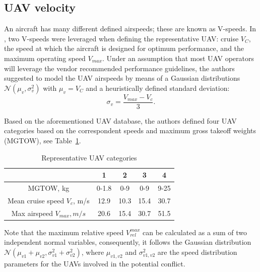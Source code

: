 \documentclass[conference]{IEEEtran}
\begin{document}
\subsection{UAV velocity}\label{sec:velocity}
An aircraft has many different defined airspeeds; these
are known as V-speeds. In \cite{Weinert18}, two V-speeds were leveraged when defining the representative UAV: cruise $V_C$, the speed at which the
aircraft is designed for optimum performance, and the maximum operating speed $V_{max}$. Under an assumption that most UAV operators will leverage the vendor recommended performance guidelines, the authors suggested to model the UAV airspeeds by means of a Gaussian distributions $\mathcal{N}(\mu_v,\sigma^2_v)$ with $\mu_v=V_C$ and a heuristically defined standard deviation:
\begin{equation}\label{eq:speed_sigma}
    \sigma_v = \frac{V_{max}-V_c}{3}.
\end{equation}

Based on the aforementioned UAV database, the authors defined four UAV categories based on the correspondent speeds and maximum gross takeoff weights (MGTOW), see Table~\ref{tab:velocity}. 
\begin{table}[]
    \centering
        \caption{Representative UAV categories}
    \begin{tabular}{c|c|c|c|c}
        &1&2&3&4  \\
        \hline
        MGTOW, kg&0-1.8&0-9&0-9&9-25\\
        Mean cruise speed $V_c$, m/s&12.9&10.3&15.4&30.7\\
        Max airspeed $V_{max}, m/s$&20.6&15.4&30.7&51.5\\
        
    \end{tabular}
    \label{tab:velocity}
\end{table}

Note that the maximum relative speed $V_{rel}^{max}$ can be calculated as a sum of two independent normal variables, consequently, it follows the Gaussian distribution $\mathcal{N}(\mu_{v1}+\mu_{v2},\sigma^2_{v1}+\sigma^2_{v2})$, where $\mu_{v1, v2}$ and $\sigma^2_{v1,v2}$ are the speed distribution parameters for the UAVs involved in the potential conflict.
\end{document}
